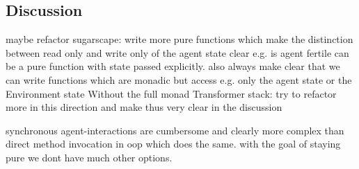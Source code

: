 \subsection{Discussion}
maybe refactor sugarscape: write more pure functions which make the distinction between read only and write only of the agent state clear e.g. is agent fertile can be a pure function with state passed explicitly. also always make clear that we can write functions which are monadic but access e.g. only the agent state or the Environment state Without the full monad Transformer stack: try to refactor more in this direction and make thus very clear in the discussion

synchronous agent-interactions are cumbersome and clearly more complex than direct method invocation in oop which does the same. with the goal of staying pure we dont have much other options.

